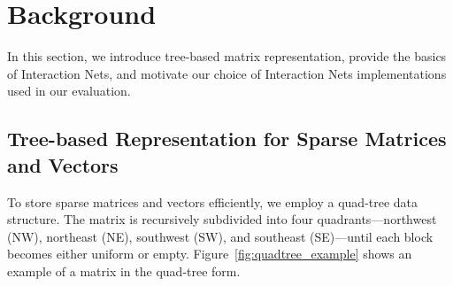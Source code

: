 \section{Background}\label{sec:background}

In this section, we introduce tree-based matrix representation, provide the basics of Interaction Nets, and motivate our choice of Interaction Nets implementations used in our evaluation.





 

\subsection{Tree-based Representation for Sparse Matrices and Vectors}

To store sparse matrices and vectors efficiently, we employ a quad-tree data structure.
The matrix is recursively subdivided into four quadrants---northwest (NW), northeast (NE), southwest (SW), and southeast (SE)---until each block becomes either uniform or empty.
Figure~\ref{fig:quadtree_example} shows an example of a matrix in the quad-tree form.

